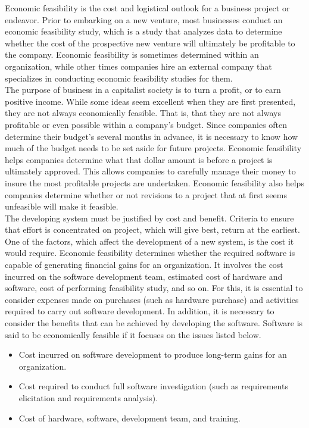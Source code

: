 Economic feasibility is the cost and logistical outlook for a business project or endeavor. Prior to embarking on a new venture, most businesses conduct an economic feasibility study, which is a study that analyzes data to determine whether the cost of the prospective new venture will ultimately be profitable to the company. Economic feasibility is sometimes determined within an organization, while other times companies hire an external company that specializes in conducting economic feasibility studies for them.\\

The purpose of business in a capitalist society is to turn a profit, or to earn positive income. While some ideas seem excellent when they are first presented, they are not always economically feasible. That is, that they are not always profitable or even possible within a company's budget. Since companies often determine their budget's several months in advance, it is necessary to know how much of the budget needs to be set aside for future projects. Economic feasibility helps companies determine what that dollar amount is before a project is ultimately approved. This allows companies to carefully manage their money to insure the most profitable projects are undertaken. Economic feasibility also helps companies determine whether or not revisions to a project that at first seems unfeasible will make it feasible.\\

The developing system must be justified by cost and benefit. Criteria to ensure that effort is concentrated on project, which will give best, return at the earliest. One of the factors, which affect the development of a new system, is the cost it would require. Economic feasibility determines whether the required software is capable of generating financial gains for an organization. It involves the cost incurred on the software development team, estimated cost of hardware and software, cost of performing feasibility study, and so on. For this, it is essential to consider expenses made on purchases (such as hardware purchase) and activities required to carry out software development. In addition, it is necessary to consider the benefits that can be achieved by developing the software. Software is said to be economically feasible if it focuses on the issues listed below.
\begin{itemize}
    \item Cost incurred on software development to produce long-term gains for an organization.
    \item Cost required to conduct full software investigation (such as requirements elicitation and requirements analysis).
    \item Cost of hardware, software, development team, and training.
\end{itemize}

